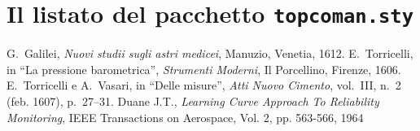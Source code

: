 \documentclass[%
    corpo=13pt,
    twoside,
    oldstyle,
    autoretitolo,
    greek,
    evenboxes,
]{toptesi}
\begin{document}
\chapter{Il listato del pacchetto \texttt{topcoman.sty}}


\begin{thebibliography}{9}
 G.~Galilei, {\em Nuovi studii sugli astri medicei}, Manuzio,
        Venetia, 1612.
 E.~Torricelli, in ``La pressione barometrica'', {\em Strumenti
        Moderni}, Il Porcellino, Firenze, 1606.
 E.~Torricelli e A.~Vasari, in ``Delle misure'', {\em Atti Nuovo
        Cimento}, vol.~III, n.~2 (feb. 1607), p.~27--31.
 Duane J.T., \emph{Learning Curve Approach To Reliability 
		Monitoring}, IEEE Transactions on Aerospace, Vol. 2, pp. 563-566, 1964
\end{thebibliography}
\end{document}
